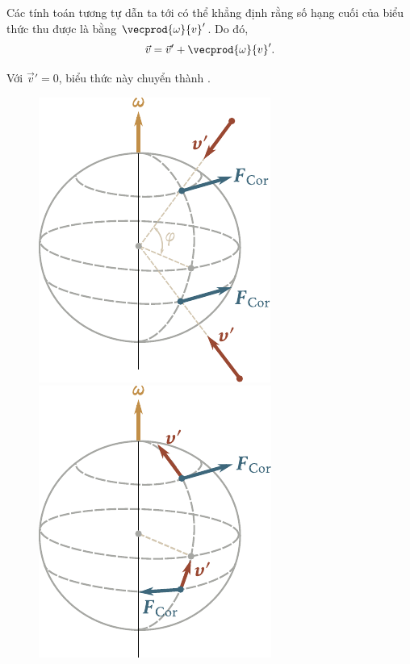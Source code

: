 \noindent
Các tính toán tương tự dẫn ta tới  có thể khẳng định rằng số hạng cuối của biểu thức thu được là bằng $\vecprod{\omega}{v}'$. Do đó,
\begin{equation}\label{eq:4_25}
\vec{v} = \vec{v}' + \vecprod{\omega}{v}'.
\end{equation}

\noindent
Với $\vec{v}'=0$, biểu thức này chuyển thành .

\begin{figure}[!htb]
	\begin{minipage}[t]{0.34\linewidth}
		\begin{center}
			\includegraphics[scale=0.84]{figures/ch_04/fig_4_9.pdf}
			\caption[]{}
			\label{fig:4_9}
		\end{center}
	\end{minipage}	
	\hspace{-0.05cm}
	\begin{minipage}[t]{0.34\linewidth}
		\begin{center}
			\includegraphics[scale=0.84]{figures/ch_04/fig_4_10.pdf}

\end{center}
\end{minipage}
\end{figure}

